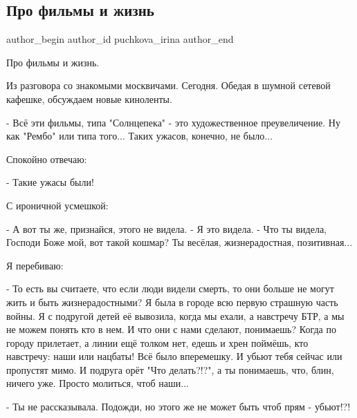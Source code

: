  
 
 
 
 
 
\subsection{Про фильмы и жизнь}
\label{sec:16_08_2021.fb.puchkova_irina.1.pro_filmy_i_zhizn_solncepek}
 
\ifcmt
 author_begin
   author_id puchkova_irina
 author_end
\fi

Про фильмы и жизнь.

Из разговора со знакомыми москвичами. Сегодня. Обедая в шумной сетевой
кафешке, обсуждаем новые киноленты. 

- Всё эти фильмы, типа "Солнцепека" - это художественное преувеличение. Ну как
"Рембо" или типа того... Таких ужасов, конечно, не было...

Спокойно отвечаю:

- Такие ужасы были!

С ироничной усмешкой:

\obeycr
- А вот ты же, признайся, этого не видела.
- Я это видела.
- Что ты видела, Господи Боже мой, вот такой кошмар? Ты весёлая, жизнерадостная, позитивная...
\restorecr

Я перебиваю:

- То есть вы считаете, что если люди видели смерть, то они больше не могут
жить и быть жизнерадостными? Я была в городе всю первую страшную часть войны.
Я с подругой детей её вывозила, когда мы ехали, а навстречу БТР, а мы не можем
понять  кто в нем. И что они с нами сделают, понимаешь? Когда по городу
прилетает, а линии ещё толком нет, едешь и хрен поймёшь, кто навстречу: наши
или нацбаты! Всё было вперемешку. И убьют тебя сейчас или пропустят мимо. И
подруга орёт "Что делать?!?", а ты понимаешь, что, блин, ничего уже. Просто
молиться, чтоб наши... 

- Ты не рассказывала. Подожди, но этого же не может быть чтоб прям - убьют!?! 

